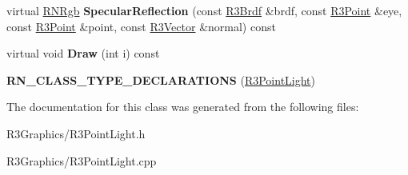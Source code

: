 \begin{DoxyCompactItemize}
\item 
virtual \hyperlink{class_r_n_rgb}{R\+N\+Rgb} {\bfseries Specular\+Reflection} (const \hyperlink{class_r3_brdf}{R3\+Brdf} \&brdf, const \hyperlink{class_r3_point}{R3\+Point} \&eye, const \hyperlink{class_r3_point}{R3\+Point} \&point, const \hyperlink{class_r3_vector}{R3\+Vector} \&normal) const \hypertarget{class_r3_point_light_a1161e3aee7a77b3b159a9d4a408bf624}{}\label{class_r3_point_light_a1161e3aee7a77b3b159a9d4a408bf624}

\item 
virtual void {\bfseries Draw} (int i) const \hypertarget{class_r3_point_light_a448f51b59539733cd8e0d3e69ae2ffaf}{}\label{class_r3_point_light_a448f51b59539733cd8e0d3e69ae2ffaf}

\item 
{\bfseries R\+N\+\_\+\+C\+L\+A\+S\+S\+\_\+\+T\+Y\+P\+E\+\_\+\+D\+E\+C\+L\+A\+R\+A\+T\+I\+O\+NS} (\hyperlink{class_r3_point_light}{R3\+Point\+Light})\hypertarget{class_r3_point_light_a6a253c888dfd0716716e71cec0b4f4e1}{}\label{class_r3_point_light_a6a253c888dfd0716716e71cec0b4f4e1}

\end{DoxyCompactItemize}


The documentation for this class was generated from the following files\+:\begin{DoxyCompactItemize}
\item 
R3\+Graphics/R3\+Point\+Light.\+h\item 
R3\+Graphics/R3\+Point\+Light.\+cpp\end{DoxyCompactItemize}
